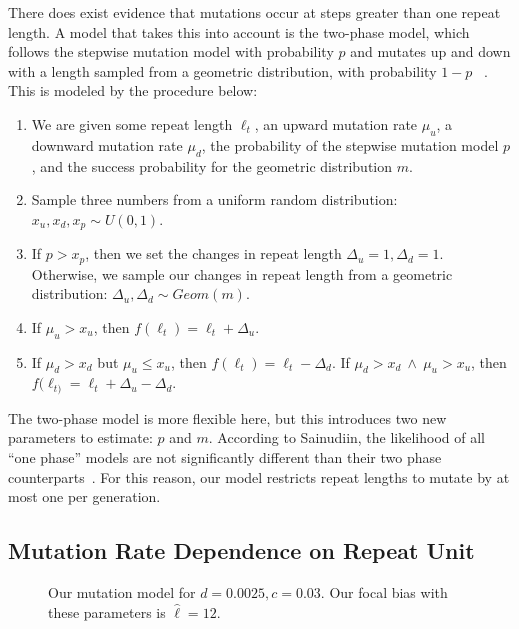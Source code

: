 There does exist evidence that mutations occur at steps greater than one repeat length.
A model that takes this into account is the two-phase model, which follows the stepwise mutation model with probability
$p$ and mutates up and down with a length sampled from a geometric distribution, with probability $1-p$
~\cite{dirienzoMutationalProcessesSimplesequence1994}.
This is modeled by the procedure below:
\begin{enumerate}
    \item We are given some repeat length $\ell_t$, an upward mutation rate $\mu_u$, a
        downward mutation rate $\mu_d$, the probability of the stepwise mutation model $p$, and the success probability
        for the geometric distribution $m$.
    \item Sample three numbers from a uniform random distribution: $x_u, x_d, x_p \sim U(0, 1)$.
    \item If $p > x_p$, then we set the changes in repeat length $\Delta_u = 1, \Delta_d = 1$.
        Otherwise, we sample our changes in repeat length from a geometric distribution:
        $\Delta_u, \Delta_d \sim \mathit{Geom}(m)$.
    \item If $\mu_u > x_u$, then $f(\ell_{t}) = \ell_t + \Delta_u$.
    \item If $\mu_d > x_d$ but $\mu_u \leq x_u$, then $f(\ell_{t}) = \ell_t - \Delta_d$.
        If $\mu_d > x_d \ \land \ \mu_u > x_u$, then $f(\ell_{t)} = \ell_{t} + \Delta_u - \Delta_d$.
\end{enumerate}

The two-phase model is more flexible here, but this introduces two new parameters to estimate: $p$ and $m$.
According to Sainudiin, the likelihood of all ``one phase'' models are
not significantly different than their two phase counterparts~\cite{sainudiinMicrosatelliteMutationModels2004}.
For this reason, our model restricts repeat lengths to mutate by at most one per generation.

\subsection{Mutation Rate Dependence on Repeat Unit}\label{subsec:mrdonru}
\begin{figure}[t]
    \centering{}
    \caption{Our mutation model for $d=0.0025, c=0.03$.
    Our focal bias with these parameters is $\hat{\ell}=12$.}\label{fig:mutationModel}
\end{figure}

